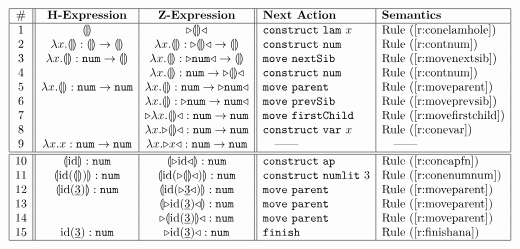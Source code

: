 \documentclass{llncs}
\begin{document}
\begin{figure}[t]
\[
\begin{array}{|c||c|c||l|l|}
\hline
\# & \textbf{H-Expression} & \textbf{Z-Expression} & \textbf{Next Action} & \textbf{Semantics}
\\
\hline
1 &
\hhole{} &
\zwsel{\hhole{}}
&
\aConstruct{\flam{x}} & \refrule{\ref{r:conelamhole}}
\\ 2 &
\hlam{x}{\hhole{}} : \tarr{\hhole{}}{\hhole{}} &
\hlam{x}{\hhole{}} : \tarr{\zwsel{\hhole{}}}{\hhole{}}
&
\aConstruct{\fnum{}} & \refrule{\ref{r:contnum}}
\\ 3 &
\hlam{x}{\hhole{}} : \tarr{\tnum{}}{\hhole{}} &
\hlam{x}{\hhole{}} : \tarr{\zwsel{\tnum{}}}{\hhole{}}
&
\aMove{\dNext{}} & \refrule{\ref{r:movenextsib}}
\\ 4 &
&
\hlam{x}{\hhole{}} : \tarr{\tnum}{\zwsel{\hhole{}}}
&
\aConstruct{\fnum{}} & \refrule{\ref{r:contnum}}
\\ 5 &
\hlam{x}{\hhole{}} : \tarr{\tnum{}}{\tnum{}} &
\hlam{x}{\hhole{}} : \tarr{\tnum{}}{\zwsel{\tnum{}}}
&
\aMove{\dParent{}} & \refrule{\ref{r:moveparent}}
\\ 6 &
&
\hlam{x}{\hhole{}} : \zwsel{\tarr{\tnum{}}{\tnum{}}}
&
\aMove{\dPrev{}} & \refrule{\ref{r:moveprevsib}}
\\ 7 &
&
\zwsel{\hlam{x}{\hhole{}}} : \tarr{\tnum{}}{\tnum{}}
&
\aMove{\dChild{}} & \refrule{\ref{r:movefirstchild}}
\\ 8 &
&
\hlam{x}{\zwsel{\hhole{}}} : \tarr{\tnum{}}{\tnum{}}
&
\aConstruct{\fvar{x}} & \refrule{\ref{r:conevar}}
\\ 9 &
\hlam{x}{{x}} : \tarr{\tnum{}}{\tnum{}}
&
\hlam{x}{\zwsel{{x}}} : \tarr{\tnum{}}{\tnum{}}
&
\quad\textrm{---{}---}
&
\quad\textrm{---{}---}
\\
\hline
\hline
10 &
\hhole{\textrm{id}} : \tnum{} &
\hhole{\zwsel{{\textrm{id}}}} : \tnum{}
&
\aConstruct{\fap{}} & \refrule{\ref{r:coneapfn}}
\\
11 &
\hhole{\hap{{{\textrm{id}}}}{{\hhole{}}}} : \tnum{}
&
\hhole{\hap{{{\textrm{id}}}}{\zwsel{\hhole{}}}} : \tnum{}
&
\aConstruct{\fnumlit{3}} &  \refrule{\ref{r:conenumnum}}
\\
12 &
\hhole{\hap{{{\textrm{id}}}}{{\hnum{3}}}} : \tnum{}
&
\hhole{\hap{{{\textrm{id}}}}{\zwsel{\hnum{3}}}} : \tnum{}
&
\aMove{\dParent{}} &  \refrule{\ref{r:moveparent}}
\\
13 &
&
\hhole{\zwsel{\hap{{{\textrm{id}}}}{{\hnum{3}}}}} : \tnum{}
&
\aMove{\dParent{}} &  \refrule{\ref{r:moveparent}}
\\
14 &
&
\zwsel{\hhole{{\hap{{{\textrm{id}}}}{{\hnum{3}}}}}} : \tnum{}
&
\aMove{\dParent{}} &  \refrule{\ref{r:moveparent}}
\\
15 &
{\hap{{{\textrm{id}}}}{{\hnum{3}}}} : \tnum{}
&
\zwsel{{{\hap{{{\textrm{id}}}}{{\hnum{3}}}}}} : \tnum{}
&
\aFinish &  \refrule{\ref{r:finishana}}
\\
\hline


\end{array}\]
\end{figure}
\end{document}
